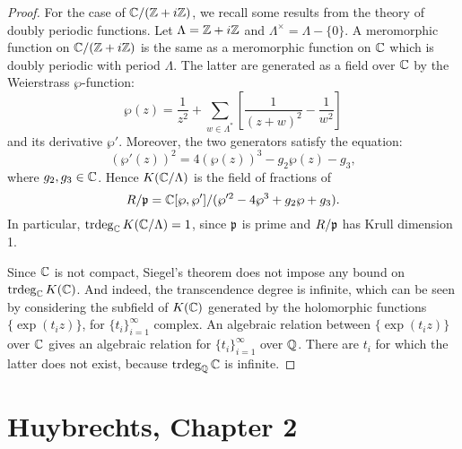 \documentclass{article}
\begin{document}
\begin{proof}
For the case of $\mathbb{C}/(\mathbb{Z} + i\mathbb{Z})$, we recall some results from the theory of doubly
periodic functions. Let $\Lambda = \mathbb{Z} + i\mathbb{Z}$ and $\Lambda^{\times} = \Lambda - \{0\}$. A meromorphic
function on $\mathbb{C}/(\mathbb{Z} + i\mathbb{Z})$ is the same as a meromorphic function on $\mathbb{C}$ which is doubly periodic
with period $\Lambda$. The latter are generated as a field over $\mathbb{C}$ by the Weierstrass $\wp$-function:
\[ \wp(z) = \frac{1}{z^2} + \sum_{w\in \Lambda^*} \left[\frac{1}{(z+w)^2} - \frac{1}{w^2} \right] \]
and its derivative $\wp'$. Moreover, the two generators satisfy the equation:
\[	(\wp'(z))^2 = 4 (\wp(z))^3 - g_2 \wp(z) - g_3	,\]
where $g_2, g_3 \in \mathbb{C}$. Hence $K(\mathbb{C}/\Lambda)$ is the field of fractions of
\[	R/\mathfrak{p}= \mathbb{C}[\wp, \wp']/(\wp'^2 - 4\wp^3 + g_2\wp + g_3).	\]
In particular, $\operatorname{trdeg}_{\mathbb{C}} K(\mathbb{C}/\Lambda) = 1$, since $\mathfrak p$ is prime and $R/\mathfrak{p}$ has Krull dimension 1.

Since $\mathbb{C}$ is not compact, Siegel's theorem does not impose any bound on $\operatorname{trdeg}_{\mathbb{C}} K(\mathbb{C})$. And indeed,
the transcendence degree is infinite, which can be seen by considering the subfield of $K(\mathbb{C})$ generated
by the holomorphic functions $\{\exp(t_i z)\}$, for $\{t_i\}_{i=1}^{\infty}$ complex. An algebraic relation
between $\{\exp(t_i z)\}$ over $\mathbb{C}$ gives an algebraic relation for $\{t_i\}_{i=1}^{\infty}$ over $\mathbb{Q}$. There
are $t_i$ for which the latter does not exist, because $\operatorname{trdeg}_{\mathbb{Q}} \mathbb{C}$ is infinite.
\end{proof}


\section{Huybrechts, Chapter 2}
\end{document}
